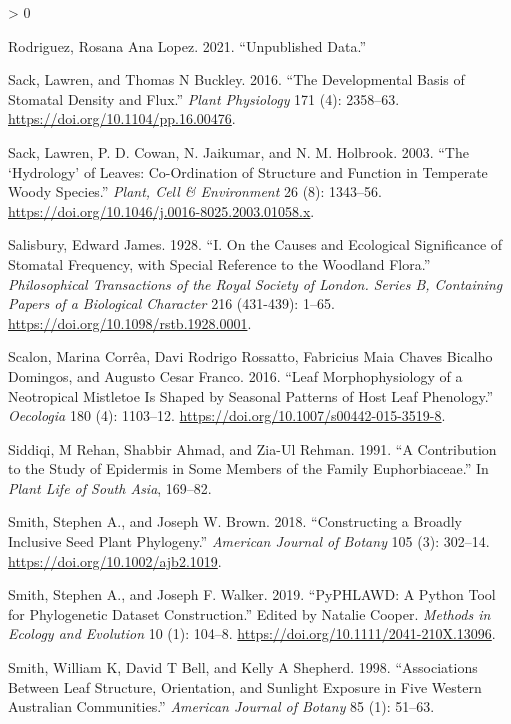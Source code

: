\documentclass[
  10pt,
]{article}
\newlength{\cslhangindent}
\newenvironment{CSLReferences}[2] %
 {%
  \setlength{\parindent}{0pt}
  \ifodd #1 \everypar{\setlength{\hangindent}{\cslhangindent}}\ignorespaces\fi
  \ifnum #2 > 0
  \setlength{\parskip}{#2\baselineskip}
  \fi
 }%
 {}
\begin{document}
\begin{CSLReferences}{1}{0}
\leavevmode\hypertarget{ref-rodriguez_unpublished_2021}{}%
Rodriguez, Rosana Ana Lopez. 2021. {``Unpublished Data.''}

\leavevmode\hypertarget{ref-sack_developmental_2016}{}%
Sack, Lawren, and Thomas N Buckley. 2016. {``The Developmental Basis of Stomatal Density and Flux.''} \emph{Plant Physiology} 171 (4): 2358--63. \url{https://doi.org/10.1104/pp.16.00476}.

\leavevmode\hypertarget{ref-sack_hydrology_2003}{}%
Sack, Lawren, P. D. Cowan, N. Jaikumar, and N. M. Holbrook. 2003. {``The {`Hydrology'} of Leaves: Co-Ordination of Structure and Function in Temperate Woody Species.''} \emph{Plant, Cell \& Environment} 26 (8): 1343--56. \url{https://doi.org/10.1046/j.0016-8025.2003.01058.x}.

\leavevmode\hypertarget{ref-salisbury_i_1928}{}%
Salisbury, Edward James. 1928. {``I. {On} the Causes and Ecological Significance of Stomatal Frequency, with Special Reference to the Woodland Flora.''} \emph{Philosophical Transactions of the Royal Society of London. Series B, Containing Papers of a Biological Character} 216 (431-439): 1--65. \url{https://doi.org/10.1098/rstb.1928.0001}.

\leavevmode\hypertarget{ref-scalon_leaf_2016}{}%
Scalon, Marina Corrêa, Davi Rodrigo Rossatto, Fabricius Maia Chaves Bicalho Domingos, and Augusto Cesar Franco. 2016. {``Leaf Morphophysiology of a {Neotropical} Mistletoe Is Shaped by Seasonal Patterns of Host Leaf Phenology.''} \emph{Oecologia} 180 (4): 1103--12. \url{https://doi.org/10.1007/s00442-015-3519-8}.

\leavevmode\hypertarget{ref-siddiqi_contribution_1991}{}%
Siddiqi, M Rehan, Shabbir Ahmad, and Zia-Ul Rehman. 1991. {``A Contribution to the Study of Epidermis in Some Members of the Family {Euphorbiaceae}.''} In \emph{Plant {Life} of {South} {Asia}}, 169--82.

\leavevmode\hypertarget{ref-smith_constructing_2018}{}%
Smith, Stephen A., and Joseph W. Brown. 2018. {``Constructing a Broadly Inclusive Seed Plant Phylogeny.''} \emph{American Journal of Botany} 105 (3): 302--14. \url{https://doi.org/10.1002/ajb2.1019}.

\leavevmode\hypertarget{ref-smith_pyphlawd_2019}{}%
Smith, Stephen A., and Joseph F. Walker. 2019. {``{PyPHLAWD}: {A} Python Tool for Phylogenetic Dataset Construction.''} Edited by Natalie Cooper. \emph{Methods in Ecology and Evolution} 10 (1): 104--8. \url{https://doi.org/10.1111/2041-210X.13096}.

\leavevmode\hypertarget{ref-smith_associations_1998}{}%
Smith, William K, David T Bell, and Kelly A Shepherd. 1998. {``Associations Between Leaf Structure, Orientation, and Sunlight Exposure in Five {Western} {Australian} Communities.''} \emph{American Journal of Botany} 85 (1): 51--63.


\end{CSLReferences}
\end{document}
